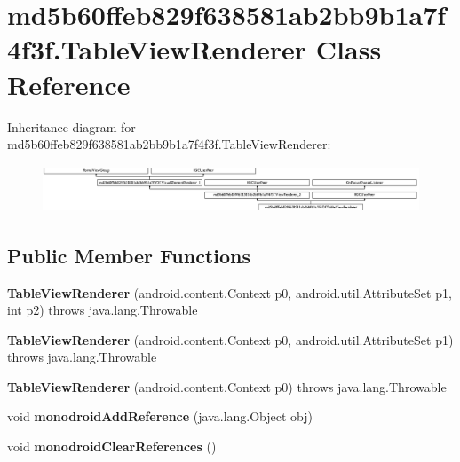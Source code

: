\hypertarget{classmd5b60ffeb829f638581ab2bb9b1a7f4f3f_1_1TableViewRenderer}{}\section{md5b60ffeb829f638581ab2bb9b1a7f4f3f.\+Table\+View\+Renderer Class Reference}
\label{classmd5b60ffeb829f638581ab2bb9b1a7f4f3f_1_1TableViewRenderer}
Inheritance diagram for md5b60ffeb829f638581ab2bb9b1a7f4f3f.\+Table\+View\+Renderer\+:\begin{figure}[H]
\begin{center}
\leavevmode
\includegraphics[height=1.403509cm]{classmd5b60ffeb829f638581ab2bb9b1a7f4f3f_1_1TableViewRenderer}
\end{center}
\end{figure}
\subsection*{Public Member Functions}
\begin{DoxyCompactItemize}
\item 
\mbox{\label{classmd5b60ffeb829f638581ab2bb9b1a7f4f3f_1_1TableViewRenderer_a68af3619c35003818e23669dc9cef59c}} 
{\bfseries Table\+View\+Renderer} (android.\+content.\+Context p0, android.\+util.\+Attribute\+Set p1, int p2)  throws java.\+lang.\+Throwable 	
\item 
\mbox{\label{classmd5b60ffeb829f638581ab2bb9b1a7f4f3f_1_1TableViewRenderer_a993ff43e62fb704b89294265d31986e0}} 
{\bfseries Table\+View\+Renderer} (android.\+content.\+Context p0, android.\+util.\+Attribute\+Set p1)  throws java.\+lang.\+Throwable 	
\item 
\mbox{\label{classmd5b60ffeb829f638581ab2bb9b1a7f4f3f_1_1TableViewRenderer_a74f51d5fe59d370780fb4fd9ad0475db}} 
{\bfseries Table\+View\+Renderer} (android.\+content.\+Context p0)  throws java.\+lang.\+Throwable 	
\item 
\mbox{\label{classmd5b60ffeb829f638581ab2bb9b1a7f4f3f_1_1TableViewRenderer_af259e91ecf2a98fa15f6cfa21ba30c72}} 
void {\bfseries monodroid\+Add\+Reference} (java.\+lang.\+Object obj)
\item 
\mbox{\label{classmd5b60ffeb829f638581ab2bb9b1a7f4f3f_1_1TableViewRenderer_a79caaf19be816b7fff9c8bc03b0cc805}} 
void {\bfseries monodroid\+Clear\+References} ()
\end{DoxyCompactItemize}
